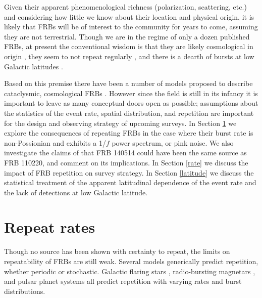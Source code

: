 \documentclass[useAMS,usenatbib]{mn2e}
\begin{document}
Given their apparent phenomenological richness
(polarization, scattering, etc.) and considering
how little we know about their location and physical 
origin, it is likely that FRBs will be of interest to the community for 
years to come, assuming they are not terrestrial.
Though we are in the regime of only a dozen published FRBs, 
at present the conventional wisdom is that they are likely cosmological
in origin \citep{2013Sci...341...53T}, they seem to not repeat regularly
\citep{2015MNRAS.454..457P}, and there is a dearth of bursts 
at low Galactic latitudes \citep{2014ApJ...789L..26P, 2014ApJ...792...19B, 2015MNRAS.451.3278M}.

Based on this premise there have been 
a number of models proposed to describe cataclysmic, cosmological 
FRBs \citep{2012ApJ...760...64M, 2013PASJ...65L..12T, 2014A&A...562A.137F, 2015ApJ...814L..20M}.
However since the field is still in its infancy it is important to
leave as many conceptual doors open as possible;
assumptions about the statistics of the event rate, 
spatial distribution, and repetition are important for the design
and observing strategy of upcoming surveys. In Section \ref{repeat} we explore the 
consequences of repeating FRBs in the case where their 
burst rate is non-Possionian and exhibits a 1/$f$ power spectrum, 
or pink noise. We also investigate the claims of \cite{2015arXiv150701002M}
that FRB 140514 could have been the same source as FRB 110220, 
and comment on its implications. In Section \ref{rate} we
discuss the impact of FRB repetition on survey strategy. In Section \ref{latitude}
we discuss the statistical treatment of the apparent latitudinal dependence 
of the event rate and the lack of detections at low Galactic latitude.


\section{Repeat rates}
\label{repeat}

Though no source has been shown with certainty to repeat, 
the limits on repeatability of FRBs are still weak. Several 
models generically predict repetition, whether periodic or stochastic. 
Galactic flaring stars \citep{2015arXiv150701002M}, radio-bursting 
magnetars \citep{2007arXiv0710.2006P, 2015ApJ...807..179P}, and pulsar planet systems 
\citep{2014A&A...569A..86M} all predict repetition with varying 
rates and burst distributions. 
\end{document}

